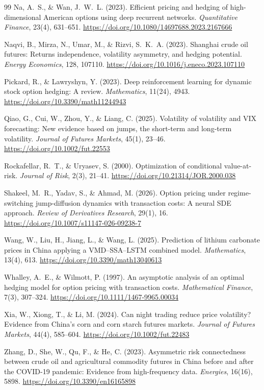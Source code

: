 \documentclass[11pt,a4paper]{article}
\begin{document}
\begin{thebibliography}{99}
Na, A.~S., \& Wan, J.~W.~L. (2023).
Efficient pricing and hedging of high-dimensional American options using deep recurrent networks.
\emph{Quantitative Finance}, 23(4), 631--651.
\url{https://doi.org/10.1080/14697688.2023.2167666}

Naqvi, B., Mirza, N., Umar, M., \& Rizvi, S.~K.~A. (2023).
Shanghai crude oil futures: Returns independence, volatility asymmetry, and hedging potential.
\emph{Energy Economics}, 128, 107110.
\url{https://doi.org/10.1016/j.eneco.2023.107110}

Pickard, R., \& Lawryshyn, Y. (2023).
Deep reinforcement learning for dynamic stock option hedging: A review.
\emph{Mathematics}, 11(24), 4943.
\url{https://doi.org/10.3390/math11244943}

Qiao, G., Cui, W., Zhou, Y., \& Liang, C. (2025).
Volatility of volatility and VIX forecasting: New evidence based on jumps, the short-term and long-term volatility.
\emph{Journal of Futures Markets}, 45(1), 23--46.
\url{https://doi.org/10.1002/fut.22553}

Rockafellar, R.~T., \& Uryasev, S. (2000).
Optimization of conditional value-at-risk.
\emph{Journal of Risk}, 2(3), 21--41.
\url{https://doi.org/10.21314/JOR.2000.038}

Shakeel, M.~R., Yadav, S., \& Ahmad, M. (2026).
Option pricing under regime-switching jump-diffusion dynamics with transaction costs: A neural SDE approach.
\emph{Review of Derivatives Research}, 29(1), 16.
\url{https://doi.org/10.1007/s11147-026-09238-7}

Wang, W., Liu, H., Jiang, L., \& Wang, L. (2025).
Prediction of lithium carbonate prices in China applying a VMD--SSA--LSTM combined model.
\emph{Mathematics}, 13(4), 613.
\url{https://doi.org/10.3390/math13040613}

Whalley, A.~E., \& Wilmott, P. (1997).
An asymptotic analysis of an optimal hedging model for option pricing with transaction costs.
\emph{Mathematical Finance}, 7(3), 307--324.
\url{https://doi.org/10.1111/1467-9965.00034}

Xia, W., Xiong, T., \& Li, M. (2024).
Can night trading reduce price volatility? Evidence from China's corn and corn starch futures markets.
\emph{Journal of Futures Markets}, 44(4), 585--604.
\url{https://doi.org/10.1002/fut.22483}

Zhang, D., She, W., Qu, F., \& He, C. (2023).
Asymmetric risk connectedness between crude oil and agricultural commodity futures in China before and after the COVID-19 pandemic: Evidence from high-frequency data.
\emph{Energies}, 16(16), 5898.
\url{https://doi.org/10.3390/en16165898}

\end{thebibliography}
\end{document}
